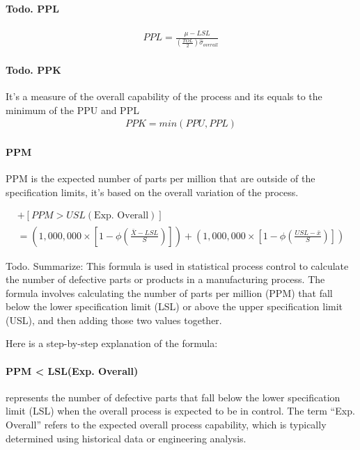 \documentclass[11pt]{article}
\begin{document}
\hypertarget{todo.-ppl}{%
\paragraph{Todo. PPL}\label{todo.-ppl}}

\begin{gather}
  PPL = \frac{\mu - LSL}{(\frac{TOL}{2})\hat{\sigma}_{overall}}
\end{gather}

\hypertarget{todo.-ppk}{%
\paragraph{Todo. PPK}\label{todo.-ppk}}

It's a measure of the overall capability of the process and its equals
to the minimum of the PPU and PPL
\begin{gather}
  PPK = min(PPU, PPL)
\end{gather}

\hypertarget{ppm}{%
\paragraph{PPM}\label{ppm}}

PPM is the expected number of parts per million that are outside of the
specification limits, it's based on the overall variation of the
process.

\begin{gather}
  [PPM < LSL(\text{Exp. Overall})] + [PPM > USL(\text{Exp. Overall})] 
  \\ = \left (1,000,000 \times \left [1 - \phi \left (\frac{\bar X - LSL}{S} \right) \right] \right) + \left (1,000,000 \times \left [1 - \phi \left(\frac{USL - \bar x}{S} \right ) \right ] \right )
\end{gather}


Todo. Summarize: This formula is used in statistical process control to
calculate the number of defective parts or products in a manufacturing
process. The formula involves calculating the number of parts per
million (PPM) that fall below the lower specification limit (LSL) or
above the upper specification limit (USL), and then adding those two
values together.

Here is a step-by-step explanation of the formula:

\paragraph{PPM \textless{} LSL(Exp. Overall)} represents the number of defective
parts that fall below the lower specification limit (LSL) when the
overall process is expected to be in control. The term ``Exp. Overall''
refers to the expected overall process capability, which is typically
determined using historical data or engineering analysis.
\end{document}
